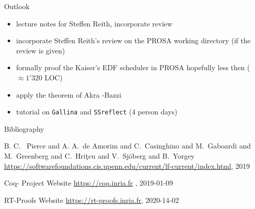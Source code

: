 \documentclass{beamer}
\begin{document}
	\begin{frame}{Outlook}
	
	
	 \begin{itemize}	 		
		 	 \item lecture notes for Steffen Reith, incorporate  review
			  \item incorporate Steffen Reith's review on the PROSA working directory (if the review is given) 
			  \item formally proof the Kaiser's EDF scheduler in PROSA hopefully less then ($\approx 1'320$ LOC)
			  \item  apply the theorem of Akra -Bazzi			 
			   \item tutorial on \texttt{Gallina} and \texttt{SSreflect} (4 person days)
			  \end{itemize}
    	
	\end{frame}

	
	
	
	
	
	
	
	
	
	
	
	\begin{frame}{Bibliography}
		\begin{thebibliography}{10}
		\beamertemplatebookbibitems
		
		
		B. C.~ Pierce and A. A.~de Amorim and C.~Casinghino and M.~Gaboardi and M.~Greenberg and C.~Hriţcu and V.~Sjöberg and B.~Yorgey
		\newblock {}
		\newblock \url{https://softwarefoundations.cis.upenn.edu/current/lf-current/index.html}, 2019
			
		Coq- Project Website	
		\newblock {}
		\newblock \url{https://coq.inria.fr} , 2019-01-09
		
		
		RT-Proofs Website
		\newblock {}	
		\newblock \url{https://rt-proofs.inria.fr}, 2020-14-02		
		\end{thebibliography}	
	\end{frame}	
	
\end{document}
